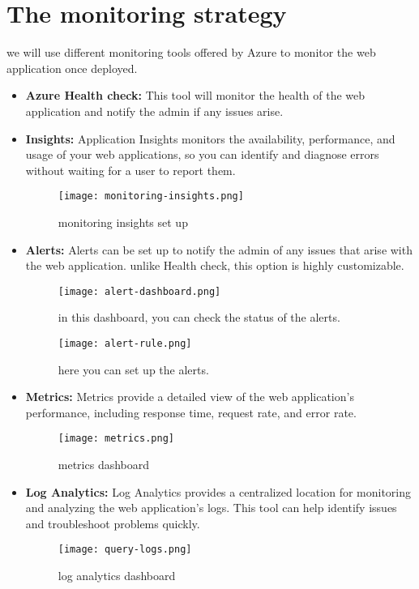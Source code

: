 \section{The monitoring strategy \cite{webArticle7}}
we will use different monitoring tools offered by Azure to monitor the web application once deployed.
\begin{itemize}
    \item \textbf{Azure Health check:} This tool will monitor the health of the web application and notify the admin if any issues arise.
    \item \textbf{Insights:} Application Insights monitors the availability, performance, and usage of your web applications, so you can identify and diagnose errors without waiting for a user to report them.

    \begin{figure}[htbp]
        \centering
        \texttt{[image: monitoring-insights.png]}
        \caption{monitoring insights set up}
        \label{fig:monitoring-insights}
    \end{figure}

    \item \textbf{Alerts:} Alerts can be set up to notify the admin of any issues that arise with the web application. unlike Health check, this option is highly customizable.

    \begin{figure}[htbp]
        \centering
        \texttt{[image: alert-dashboard.png]}
        \caption{in this dashboard, you can check the status of the alerts.}
        \label{fig:monitoring-alerts}
    \end{figure}

    \begin{figure}[htbp]
        \centering
        \texttt{[image: alert-rule.png]}
        \caption{here you can set up the alerts.}
        \label{fig:monitoring-set-up-alerts}
    \end{figure}

    \item \textbf{Metrics:} Metrics provide a detailed view of the web application's performance, including response time, request rate, and error rate.

    \begin{figure}[htbp]
        \centering
        \texttt{[image: metrics.png]}
        \caption{metrics dashboard}
        \label{fig:monitoring-metrics}
    \end{figure}

    \item \textbf{Log Analytics:} Log Analytics provides a centralized location for monitoring and analyzing the web application's logs. This tool can help identify issues and troubleshoot problems quickly.

    \begin{figure}[htbp]
        \centering
        \texttt{[image: query-logs.png]}
        \caption{log analytics dashboard}
        \label{fig:monitoring-log-analytics}
    \end{figure}

\end{itemize}
